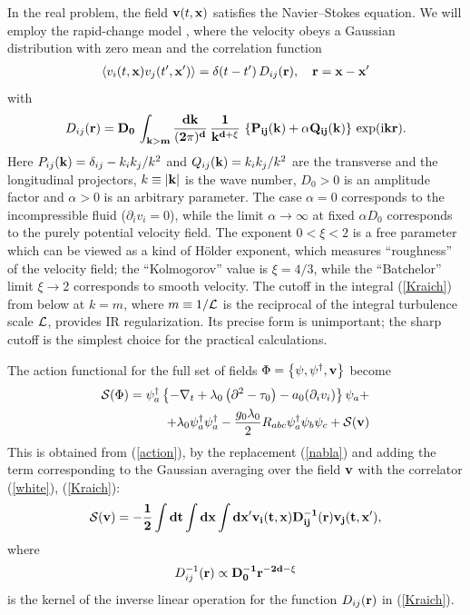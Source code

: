 \documentclass[12pt]{article}
\def\S{{\cal S}}
\def\bfx{{\bf x}}
\def\bfv{{\bf v}}
\begin{document}
In the real problem, the field ${\bf v}(t,{\bf x})$ satisfies the
Navier--Stokes equation. We will employ the rapid-change model \cite{FGV},
where the velocity obeys a Gaussian distribution with zero mean and
the correlation function
\begin{eqnarray}
\langle v_{i}(t, \bfx) v_{j}(t',{\bf x'})\rangle =  \delta(t-t')\,
D_{ij}(\bf r), \quad \bf r = \bf x-{\bf x'}
\label{white}
\end{eqnarray}
with
\begin{eqnarray}
D_{ij}(\bf {r}) = D_{0}\, \int_{k>m} \frac{d{\bf {k}}}{(2\pi)^{d}} \,
\frac{1}{k^{d+\xi}}\, \left\{ P_{ij}({\bf k})+\alpha Q_{ij}({\bf
k}) \right\}\, \exp ({\rm i} {\bf {kr}} ).
\label{Kraich}
\end{eqnarray}
Here $P_{ij}({\bf k}) = \delta_{ij} - k_i k_j / k^2$ and
$Q_{ij}({\bf k})=k_i k_j/k^2$ are the transverse and the longitudinal
projectors, $k\equiv |{\bf k}|$ is the wave number,
$D_{0}>0$ is an amplitude factor and $\alpha>0$ is an arbitrary
parameter. The case $\alpha=0$ corresponds to the incompressible fluid
($\partial _i v_{i}=0$), while the limit $\alpha \to\infty$ at fixed
$\alpha D_{0}$ corresponds to the purely potential velocity field.
The exponent $0<\xi<2$ is a free parameter which can be viewed as a kind
of H\"{o}lder exponent, which measures ``roughness'' of the velocity field;
the ``Kolmogorov'' value is $\xi=4/3$, while the ``Batchelor'' limit
$\xi\to2$ corresponds to smooth velocity. The cutoff in the
integral (\ref{Kraich}) from below at $k=m$, where $m\equiv 1/{\cal L}$ is
the reciprocal of the integral turbulence scale ${\cal L}$, provides IR
regularization. Its precise form is unimportant; the sharp cutoff is the
simplest choice for the practical calculations.

The action functional for the full set of fields
$\Phi = \left\{ \psi,\psi^{\dag},{\bf v} \right\}$ become
\begin{eqnarray}
\S(\Phi) = \psi^{\dag}_{a} \left\{
-\nabla_{t} + \lambda_{0}\left( \partial^{2}- \tau_{0}\right)
- a_{0} (\partial_{i}v_{i}) \right\} \psi_{a} + \\ \nonumber
 +\lambda_{0} \psi^{\dag}_{a}\psi^{\dag}_{a}
- \frac{g_{0}\lambda_{0}}{2}R_{abc} \psi^{\dag}_{a} \psi_{b}\psi_{c} +  \S(\bfv)
\label{Action}
\end{eqnarray}
This is obtained from (\ref{action}), by the replacement
(\ref{nabla}) and adding the term corresponding to the Gaussian averaging
over the field $\bfv$ with the correlator (\ref{white}), (\ref{Kraich}):
\begin{eqnarray}
\S(\bf{v}) = -\frac{1}{2} \int dt \int d{\bf {x}} \int d{\bf {x'}}
v_{i} (t,\bf{x}) D_{ij}^{-1}(\bf{r}) v_{j} (t, {\bf {x'}}),
\label{Sv}
\end{eqnarray}
where
\[ D_{ij}^{-1}(\bf{r}) \propto D_{0}^{-1} r^{-2d-\xi} \]
is the kernel of the inverse linear operation for the function
$D_{ij}(\bf{r})$ in (\ref{Kraich}).
\end{document}
